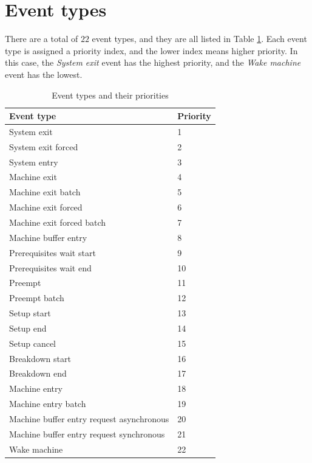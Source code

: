 \section{Event types}
\label{sec:event_types}

There are a total of $22$ event types, and they are all listed in Table \ref{tab:event_types}. Each event type is assigned a priority index, and the lower index means higher priority. In this case, the \textit{System exit} event has the highest priority, and the \textit{Wake machine} event has the lowest.

\begin{table}[!htbp]
    \begin{center}
        \begin{tabular}{|l|l|} 
         \hline
         Event type & Priority \\ [0.5ex] 
         \hline\hline
         System exit & 1 \\ 
         \hline
         System exit forced & 2 \\
         \hline
         System entry & 3 \\
         \hline
         Machine exit & 4 \\
         \hline
         Machine exit batch & 5 \\
         \hline
         Machine exit forced & 6 \\
         \hline
         Machine exit forced batch & 7 \\
         \hline
         Machine buffer entry & 8 \\
         \hline
         Prerequisites wait start & 9 \\
         \hline
         Prerequisites wait end & 10 \\
         \hline
         Preempt & 11 \\
         \hline
         Preempt batch & 12 \\
         \hline
         Setup start & 13 \\
         \hline
         Setup end & 14 \\
         \hline
         Setup cancel & 15 \\
         \hline
         Breakdown start & 16 \\
         \hline
         Breakdown end & 17 \\
         \hline
         Machine entry & 18 \\
         \hline
         Machine entry batch & 19 \\
         \hline
         Machine buffer entry request asynchronous & 20 \\
         \hline
         Machine buffer entry request synchronous & 21 \\
         \hline
         Wake machine & 22 \\
         \hline
        \end{tabular}
        \end{center}
        \caption{Event types and their priorities}
    \label{tab:event_types}
    \end{table}

